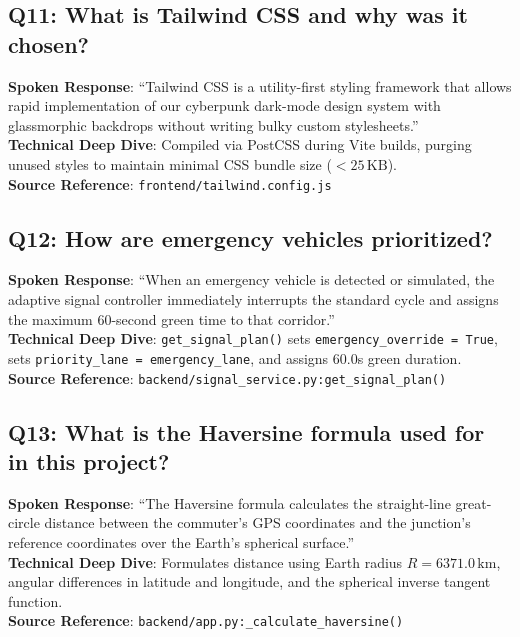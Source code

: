 \documentclass[11pt,a4paper,oneside]{report}
\begin{document}
\subsection*{Q11: What is Tailwind CSS and why was it chosen?}
\begin{interviewbox}
\textbf{Spoken Response}: ``Tailwind CSS is a utility-first styling framework that allows rapid implementation of our cyberpunk dark-mode design system with glassmorphic backdrops without writing bulky custom stylesheets.''\\
\textbf{Technical Deep Dive}: Compiled via PostCSS during Vite builds, purging unused styles to maintain minimal CSS bundle size ($< 25\,\text{KB}$).\\
\textbf{Source Reference}: \texttt{frontend/tailwind.config.js}
\end{interviewbox}

\subsection*{Q12: How are emergency vehicles prioritized?}
\begin{interviewbox}
\textbf{Spoken Response}: ``When an emergency vehicle is detected or simulated, the adaptive signal controller immediately interrupts the standard cycle and assigns the maximum 60-second green time to that corridor.''\\
\textbf{Technical Deep Dive}: \texttt{get\_signal\_plan()} sets \texttt{emergency\_override = True}, sets \texttt{priority\_lane = emergency\_lane}, and assigns 60.0s green duration.\\
\textbf{Source Reference}: \texttt{backend/signal\_service.py:get\_signal\_plan()}
\end{interviewbox}

\subsection*{Q13: What is the Haversine formula used for in this project?}
\begin{interviewbox}
\textbf{Spoken Response}: ``The Haversine formula calculates the straight-line great-circle distance between the commuter's GPS coordinates and the junction's reference coordinates over the Earth's spherical surface.''\\
\textbf{Technical Deep Dive}: Formulates distance using Earth radius $R = 6371.0\,\text{km}$, angular differences in latitude and longitude, and the spherical inverse tangent function.\\
\textbf{Source Reference}: \texttt{backend/app.py:\_calculate\_haversine()}
\end{interviewbox}
\end{document}
